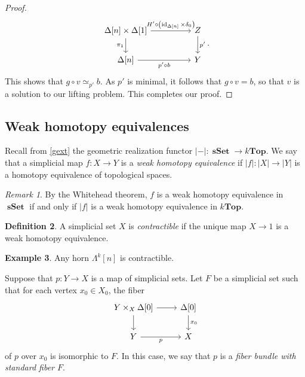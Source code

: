 \documentclass[10pt,letterpaper,cm]{nupset}
\theoremstyle{definition}
\newtheorem{definition}{Definition}[subsection]
\newtheorem{exmp}[definition]{Example}
\theoremstyle{theorem}
\theoremstyle{remark}
\newtheorem{remark}[definition]{Remark}
\newcommand{\0}{\mathbf{0}}
\newcommand{\1}{\mathbf{1}}
\newcommand{\2}{\mathbf{2}}
\DeclareMathOperator{\sset}{\mathbf{sSet}}
\DeclareMathOperator{\idd}{id}
\begin{document}
\begin{proof}
\[\begin{tikzcd}[column sep=huge]
{\Delta[n]\times \Delta[1]} \arrow[d, "\pi_1"'] \arrow[r, "{H'\circ \left(\idd_{\Delta[n]} \times \delta_0\right)}"] & Z \arrow[d, "p'"]                           \\
{\Delta[n]} \arrow[r, "p'\circ b"']                                                                                  & Y                                          
\end{tikzcd}.
\] This shows that $g\circ v \simeq_{p'} b$. As $p'$ is minimal, it follows that  $g\circ v = b$, so that $v$ is a solution to our lifting problem. This completes our proof.
\end{proof}

\subsection*{Weak homotopy equivalences}

Recall from \cref{gext} the geometric realization functor $\left\lvert{-}\right\rvert : \sset \to  k\mathbf{Top}$. We say that a simplicial map $f: X \to Y$ is a \textit{weak homotopy equivalence} if $\left\lvert{f}\right\rvert : \left\lvert{X}\right\rvert \to \left\lvert{Y}\right\rvert$ is a homotopy equivalence of topological spaces. 

\begin{remark}
By the Whitehead theorem, $f$ is a weak homotopy equivalence in $\sset$ if and only if $\left\lvert{f}\right\rvert$ is a weak homotopy equivalence in  $k\mathbf{Top}$.
\end{remark}

\begin{definition}
A simplicial set $X$ is \textit{contractible} if the unique map $X \to 1$ is a weak homotopy equivalence.
\end{definition}

\begin{exmp}
Any horn $\Lambda^k[n]$ is contractible.
\end{exmp}

\smallskip

Suppose that $p: Y \to X$ is a map of simplicial sets. Let $F$ be a simplicial set such that for each vertex $x_0 \in X_0$,  the fiber 
\[
\begin{tikzcd}
{Y\times_X \Delta[0]} \arrow[d] \arrow[r] & {\Delta[0]} \arrow[d, "x_0"] \\
Y \arrow[r, "p"']                         & X                           
\end{tikzcd}
\] of $p$ over $x_0$ is isomorphic to $F$. In this case, we say that $p$ is a \textit{fiber bundle with standard fiber $F$}. 
\end{document}
